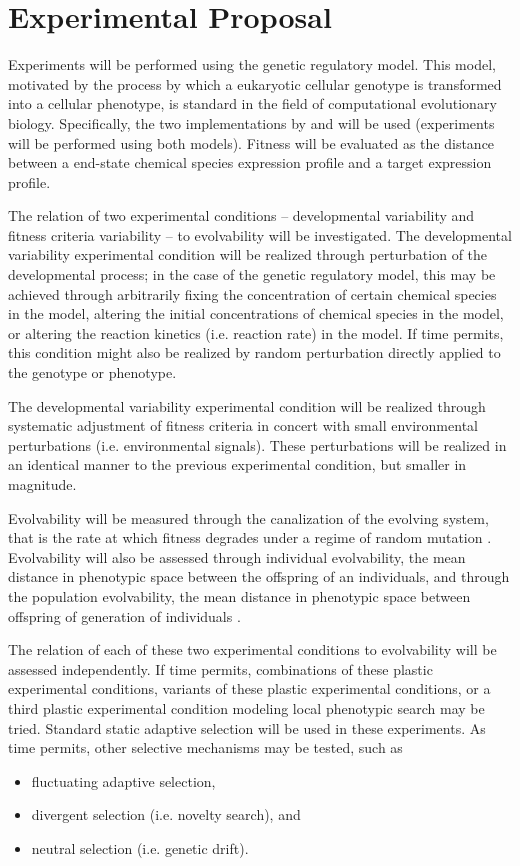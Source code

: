 \section{Experimental Proposal} \label{sec:experiment}

Experiments will be performed using the genetic regulatory model. This model, motivated by the process by which a eukaryotic cellular genotype is transformed into a cellular phenotype, is standard in the field of computational evolutionary biology. Specifically, the two implementations by \cite{Reisinger2005TowardsEvolvability} and \cite{Wilder2015ReconcilingEvolvability} will be used (experiments will be performed using both models). Fitness will be evaluated as the distance between a end-state chemical species expression profile and a target expression profile.

The relation of two experimental conditions -- developmental variability and fitness criteria variability -- to evolvability will be investigated. The developmental variability experimental condition will be realized through perturbation of the developmental process; in the case of the genetic regulatory model, this may be achieved through arbitrarily fixing the concentration of certain chemical species in the model, altering the initial concentrations of chemical species in the model, or altering the reaction kinetics (i.e. reaction rate) in the model. If time permits, this condition might also be realized by random perturbation directly applied to the genotype or phenotype. 

The developmental variability experimental condition will be realized through systematic adjustment of fitness criteria in concert with small environmental perturbations (i.e. environmental signals). These perturbations will be realized in an identical manner to the previous experimental condition, but smaller in magnitude.

Evolvability will be measured through the canalization of the evolving system, that is the rate at which fitness degrades under a regime of random mutation \cite{Reisinger2007AcquiringRepresentations}. Evolvability will also be assessed through individual evolvability, the mean distance in phenotypic space between the offspring of an individuals, and through the population evolvability, the mean distance in phenotypic space between offspring of generation of individuals \cite{Wilder2015ReconcilingEvolvability}.

The relation of each of these two experimental conditions to evolvability will be assessed independently. If time permits, combinations of these plastic experimental conditions, variants of these plastic experimental conditions, or a third plastic experimental condition modeling local phenotypic search may be tried. Standard static adaptive selection will be used in these experiments. As time permits, other selective mechanisms may be tested, such as
\begin{itemize}
  \item fluctuating adaptive selection,
  \item divergent selection (i.e. novelty search), and
  \item neutral selection (i.e. genetic drift).
\end{itemize}

